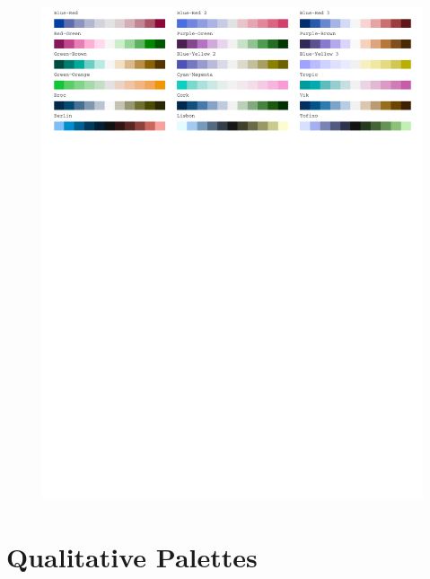 \begin{figure}[H]
\centering
\includegraphics[width = \textwidth, trim= 0 8in 0 0, clip]{graphics/appFigs/hcl_pals_div.pdf}
\end{figure}

\section{Qualitative Palettes}

